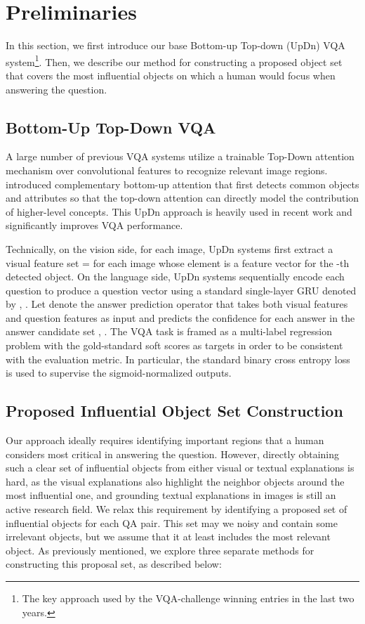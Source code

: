 \documentclass{article}
\begin{document}
\section{Preliminaries}
In this section, we first introduce our base Bottom-up Top-down (UpDn) VQA system\footnote{The key approach used by the VQA-challenge winning entries in the last two years.}\cite{anderson2017bottom}.  Then, we describe our method for constructing a proposed object set that covers the most influential objects on which a human would focus when answering the question.

\subsection{Bottom-Up Top-Down VQA}
A large number of previous VQA systems \cite{fukui2016multimodal,ben2017mutan,ramakrishnan2018overcoming} utilize a trainable Top-Down attention mechanism over convolutional features to recognize relevant image regions. \cite{anderson2017bottom} introduced complementary bottom-up attention that first detects common objects and attributes so that the top-down attention can directly model the contribution of higher-level concepts. This UpDn approach is heavily used in recent work \cite{selvaraju2019taking,wu2018faithful,jiang2018pythia,xie2019visual,shah2019cycle} and significantly improves VQA performance.

Technically, on the vision side, for each image, UpDn systems first extract a visual feature set  =  for each image whose element  is a feature vector for the -th detected object. On the language side, UpDn systems sequentially encode each question  to produce a question vector  using a standard single-layer GRU \cite{cho2014learning} denoted by ,  . Let  denote the answer prediction operator that takes both visual features and question features as input and predicts the confidence for each answer  in the answer candidate set ,   . The VQA task is framed as a multi-label regression problem with the gold-standard soft scores as targets in order to be consistent with the evaluation metric. In particular, the standard binary cross entropy loss  is used to supervise the sigmoid-normalized outputs.


\subsection{Proposed Influential Object Set Construction}
Our approach ideally requires identifying important regions that a human considers most critical in answering the question. However, directly obtaining such a clear set of influential objects from either visual or textual explanations is hard, as the visual explanations also highlight the neighbor objects around the most influential one, and grounding textual explanations in images is still an active research field. We relax this requirement by identifying a proposed set of influential objects  for each QA pair. This set may we noisy and contain some irrelevant objects, but we assume that it at least includes the most relevant object. As previously mentioned, we explore three separate methods for constructing this proposal set, as described below:
\end{document}
